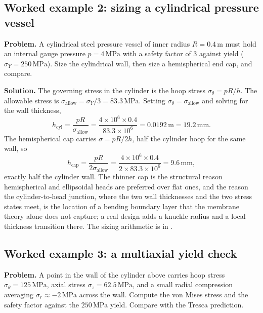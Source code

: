 \subsection*{Worked example 2: sizing a cylindrical pressure vessel}

\textbf{Problem.} A cylindrical steel pressure vessel of inner radius
$R = 0.4\,\si{\meter}$ must hold an internal gauge pressure
$p = 4\,\text{MPa}$ with a safety factor of $3$ against yield
($\sigma_Y = 250\,\text{MPa}$). Size the cylindrical wall, then size a
hemispherical end cap, and compare.

\textbf{Solution.} The governing stress in the cylinder is the hoop
stress $\sigma_\theta = pR/h$. The allowable stress is $\sigma_{\text{
allow}} = \sigma_Y/3 = 83.3\,\text{MPa}$. Setting $\sigma_\theta =
\sigma_{\text{allow}}$ and solving for the wall thickness,
\[
h_{\text{cyl}} = \frac{pR}{\sigma_{\text{allow}}} = \frac{4\times 10^6
\times 0.4}{83.3\times 10^6} = 0.0192\,\text{m} = 19.2\,\si{\milli\meter}.
\]
The hemispherical cap carries $\sigma = pR/2h$, half the cylinder hoop
for the same wall, so
\[
h_{\text{cap}} = \frac{pR}{2\sigma_{\text{allow}}} = \frac{4\times 10^6
\times 0.4}{2\times 83.3\times 10^6} = 9.6\,\si{\milli\meter},
\]
exactly half the cylinder wall. The thinner cap is the structural
reason hemispherical and ellipsoidal heads are preferred over flat
ones, and the reason the cylinder-to-head junction, where the two wall
thicknesses and the two stress states meet, is the location of a
bending boundary layer that the membrane theory alone does not
capture; a real design adds a knuckle radius and a local thickness
transition there. The sizing arithmetic is in
.

\subsection*{Worked example 3: a multiaxial yield check}

\textbf{Problem.} A point in the wall of the cylinder above carries
hoop stress $\sigma_\theta = 125\,\text{MPa}$, axial stress $\sigma_z =
62.5\,\text{MPa}$, and a small radial compression averaging
$\sigma_r \approx -2\,\text{MPa}$ across the wall. Compute the von
Mises stress and the safety factor against the $250\,\text{MPa}$
yield. Compare with the Tresca prediction.

